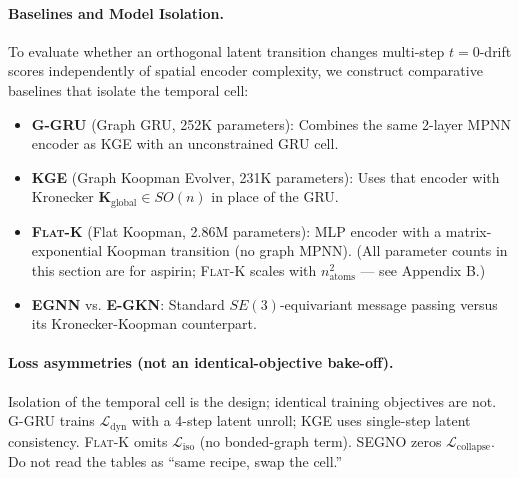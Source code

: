 \documentclass{article}
\newcommand{\K}{\mathbf{K}}
\newcommand{\GKE}{\textsc{KGE}}
\newcommand{\EGKN}{\textsc{E-GKN}}
\newcommand{\EGNN}{\textsc{EGNN}}
\newcommand{\GGRU}{\textsc{G-GRU}}
\newcommand{\FKoop}{\textsc{Flat-K}}
\begin{document}
\paragraph{Baselines and Model Isolation.}
To evaluate whether an orthogonal latent transition changes multi-step $t=0$-drift scores independently of spatial encoder complexity, we construct comparative baselines that isolate the temporal cell:
\begin{itemize}
  \item \textbf{\GGRU{}} (Graph GRU, 252K parameters): Combines the same 2-layer MPNN encoder as \GKE{} with an unconstrained GRU cell.
  \item \textbf{\GKE{}} (Graph Koopman Evolver, 231K parameters): Uses that encoder with Kronecker $\K_{\text{global}}\in SO(n)$ in place of the GRU.
  \item \textbf{\FKoop{}} (Flat Koopman, 2.86M parameters): MLP encoder with a matrix-exponential Koopman transition (no graph MPNN). (All parameter counts in this section are for aspirin; \FKoop{} scales with $n_{\text{atoms}}^2$ --- see Appendix B.)
  \item \textbf{\EGNN{}} vs. \textbf{\EGKN{}}: Standard $SE(3)$-equivariant message passing versus its Kronecker-Koopman counterpart.
\end{itemize}

\paragraph{Loss asymmetries (not an identical-objective bake-off).}
Isolation of the temporal cell is the design; identical training objectives are not. \GGRU{} trains $\mathcal{L}_{\text{dyn}}$ with a 4-step latent unroll; \GKE{} uses single-step latent consistency. \FKoop{} omits $\mathcal{L}_{\text{iso}}$ (no bonded-graph term). \textsc{SEGNO} zeros $\mathcal{L}_{\text{collapse}}$. Do not read the tables as ``same recipe, swap the cell.''
\end{document}
